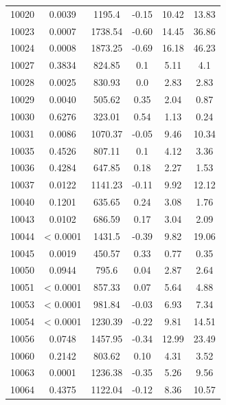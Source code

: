 {\begin{longtable}{cccccc}
10020 & {\color{red}0.0039} & 1195.4 & -0.15 & 10.42 & 13.83 \\
10023 & {\color{red}0.0007} & 1738.54 & -0.60 & 14.45 & 36.86 \\
10024 & {\color{red}0.0008} & 1873.25 & -0.69 & 16.18 & 46.23 \\
10027 & 0.3834 & 824.85 & 0.1 & 5.11 & 4.1 \\
10028 & {\color{red}0.0025} & 830.93 & 0.0 & 2.83 & 2.83 \\
10029 & {\color{red}0.0040} & 505.62 & 0.35 & 2.04 & 0.87 \\
10030 & 0.6276 & 323.01 & 0.54 & 1.13 & 0.24 \\
10031 & {\color{red}0.0086} & 1070.37 & -0.05 & 9.46 & 10.34 \\
10035 & 0.4526 & 807.11 & 0.1 & 4.12 & 3.36 \\
10036 & 0.4284 & 647.85 & 0.18 & 2.27 & 1.53 \\
10037 & {\color{red}0.0122} & 1141.23 & -0.11 & 9.92 & 12.12 \\
10040 & 0.1201 & 635.65 & 0.24 & 3.08 & 1.76 \\
10043 & {\color{red}0.0102} & 686.59 & 0.17 & 3.04 & 2.09 \\
10044 & {\color{red}< 0.0001} & 1431.5 & -0.39 & 9.82 & 19.06 \\
10045 & {\color{red}0.0019} & 450.57 & 0.33 & 0.77 & 0.35 \\
10050 & 0.0944 & 795.6 & 0.04 & 2.87 & 2.64 \\
10051 & {\color{red}< 0.0001} & 857.33 & 0.07 & 5.64 & 4.88 \\
10053 & {\color{red}< 0.0001} & 981.84 & -0.03 & 6.93 & 7.34 \\
10054 & {\color{red}< 0.0001} & 1230.39 & -0.22 & 9.81 & 14.51 \\
10056 & 0.0748 & 1457.95 & -0.34 & 12.99 & 23.49 \\
10060 & 0.2142 & 803.62 & 0.10 & 4.31 & 3.52 \\
10063 & {\color{red}0.0001} & 1236.38 & -0.35 & 5.26 & 9.56 \\
10064 & 0.4375 & 1122.04 & -0.12 & 8.36 & 10.57 \\ \hline
\end{longtable}
}

